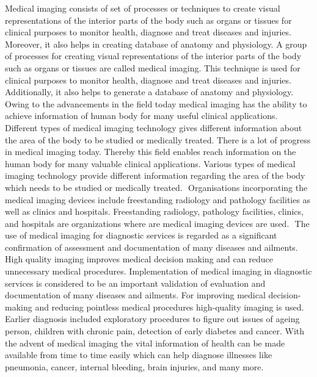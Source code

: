 Medical imaging consists of set of processes or techniques to create visual representations of the interior parts of the body such as organs or tissues for clinical purposes to monitor health, diagnose and treat diseases and injuries. Moreover, it also helps in creating database of anatomy and physiology.
A group of processes for creating visual representations of the interior parts of the body such as organs or tissues are called medical imaging. This technique is used for clinical purposes to monitor health, diagnose and treat diseases and injuries. Additionally, it also helps to generate a database of anatomy and physiology.
 Owing to the advancements in the field today medical imaging has the ability to achieve information of human body for many useful clinical applications. Different types of medical imaging technology gives different information about the area of the body to be studied or medically treated.
There is a lot of progress in medical imaging today. Thereby this field enables reach information on the human body for many valuable clinical applications. Various types of medical imaging technology provide different information regarding the area of the body which needs to be studied or medically treated.
  Organisations incorporating the medical imaging devices include freestanding radiology and pathology facilities as well as clinics and hospitals.
Freestanding radiology, pathology facilities, clinics, and hospitals are organizations where are medical imaging devices are used.  The use of medical imaging for diagnostic services is regarded as a significant confirmation of assessment and documentation of many diseases and ailments. High quality imaging improves medical decision making and can reduce unnecessary medical procedures.
Implementation of medical imaging in diagnostic services is considered to be an important validation of evaluation and documentation of many diseases and ailments. For improving medical decision-making and reducing pointless medical procedures high-quality imaging is used.  Earlier diagnosis included exploratory procedures to figure out issues of ageing person, children with chronic pain, detection of early diabetes and cancer. With the advent of medical imaging the vital information of health can be made available from time to time easily which can help diagnose illnesses like pneumonia, cancer, internal bleeding, brain injuries, and many more.

